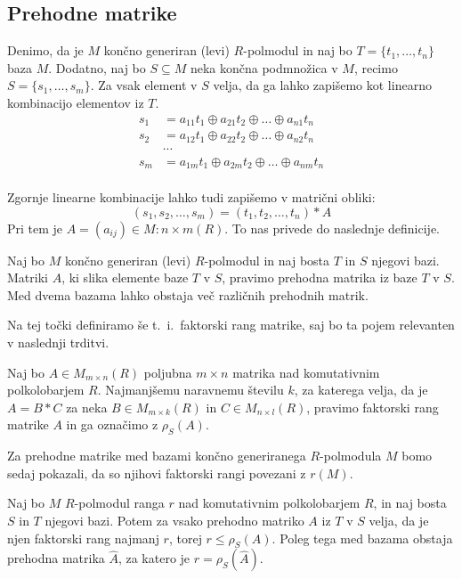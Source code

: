 \documentclass[mat1]{fmfdelo}
\begin{document}
\subsection{Prehodne matrike}
Denimo, da je $M$ končno generiran (levi) $R$-polmodul in naj bo $T = \{t_1, \ldots, t_n\}$ baza $M$. Dodatno, naj bo $S\subseteq M$ neka končna podmnožica v $M$, recimo $S = \{s_1, \ldots, s_m\}$. Za vsak element v $S$ velja, da ga lahko zapišemo kot linearno kombinacijo elementov iz $T$. \begin{align*}
	s_1 &= a_{11}t_1 \oplus a_{21}t_2 \oplus \ldots \oplus a_{n1}t_n \\
	s_2 &= a_{12}t_1 \oplus a_{22}t_2 \oplus \ldots \oplus a_{n2}t_n \\
	&\cdots \\
	s_m &= a_{1m}t_1 \oplus a_{2m}t_2 \oplus \ldots \oplus a_{nm}t_n \\
\end{align*}

Zgornje linearne kombinacije lahko tudi zapišemo v matrični obliki:$$
(s_1, s_2, \ldots, s_m )
 = (t_1, t_2, \ldots, t_n) * A$$ 
Pri tem je $A=(a_{ij})\in M:{n\times m}(R)$.
To nas privede do naslednje definicije.

\begin{definicija}\label{def:prehodmat}
	Naj bo $M$ končno generiran (levi) $R$-polmodul in naj bosta $T$ in $S$ njegovi bazi. Matriki $A$, ki slika elemente baze $T$ v $S$, pravimo prehodna matrika iz baze $T$ v $S$. Med dvema bazama lahko obstaja več različnih prehodnih matrik.
\end{definicija}

Na tej točki definiramo še t.~i.~faktorski rang matrike, saj bo ta pojem relevanten v naslednji trditvi.

\begin{definicija}\label{def:faktorrang}
	Naj bo $A\in M_{m\times n}(R)$ poljubna $m\times n$ matrika nad komutativnim polkolobarjem $R$. Najmanjšemu naravnemu številu $k$, za katerega velja, da je $A= B*C$ za neka $B\in M_{m\times k}(R)$ in $C\in M_{n\times l}(R)$, pravimo faktorski rang matrike $A$ in ga označimo z $\rho_S(A)$.
\end{definicija}

Za prehodne matrike med bazami končno generiranega $R$-polmodula $M$ bomo sedaj pokazali, da so njihovi faktorski rangi povezani z $r(M)$.

\begin{izrek}\label{izr:transmatfakrang}
	Naj bo $M$ $R$-polmodul ranga $r$ nad komutativnim polkolobarjem $R$, in naj bosta $S$ in $T$ njegovi bazi. Potem za vsako prehodno matriko $A$ iz $T$ v $S$ velja, da je njen faktorski rang najmanj $r$, torej $r \leq \rho_S(A)$. Poleg tega med bazama obstaja prehodna matrika $\widehat{A}$, za katero je $r = \rho_S(\widehat{A})$.
\end{izrek}
\end{document}
